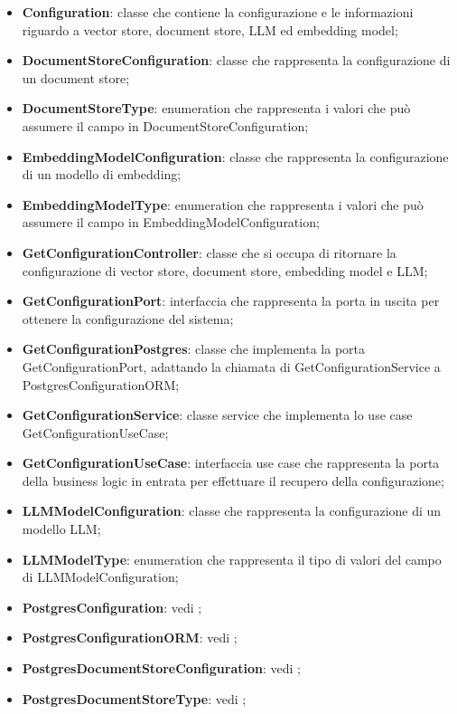 \documentclass[10pt, a4paper]{article}
\begin{document}
\begin{itemize}

    \item \label{Configuration}\textbf{Configuration}: classe che contiene la configurazione e le informazioni riguardo a vector store, document store, LLM ed embedding model;
  
    
    \item \label{DocumentStoreConfiguration}\textbf{DocumentStoreConfiguration}: classe che rappresenta la configurazione di un document store;
    \item \label{DocumentStoreType}\textbf{DocumentStoreType}:  enumeration che rappresenta i valori che può assumere il campo  in DocumentStoreConfiguration;
    \item \label{EmbeddingModelConfiguration}\textbf{EmbeddingModelConfiguration}: classe che rappresenta la configurazione di un modello di embedding;
    \item \label{EmbeddingModelType}\textbf{EmbeddingModelType}: enumeration che rappresenta i valori che può assumere il campo  in EmbeddingModelConfiguration;
    \item \label{GetConfigurationController}\textbf{GetConfigurationController}: classe che si occupa di ritornare la configurazione di vector store, document store, embedding model e LLM;
    \item \label{GetConfigurationPort}\textbf{GetConfigurationPort}: interfaccia che rappresenta la porta in uscita per ottenere la configurazione del sistema;
    \item \label{GetConfigurationPostgres}\textbf{GetConfigurationPostgres}: classe che implementa la porta GetConfigurationPort, adattando la chiamata di GetConfigurationService a PostgresConfigurationORM;
    \item \label{GetConfigurationService}\textbf{GetConfigurationService}: classe service che implementa lo use case GetConfigurationUseCase;
    \item \label{GetConfigurationUseCase}\textbf{GetConfigurationUseCase}: interfaccia use case che rappresenta la porta della business logic in entrata per effettuare il recupero della configurazione; 
    
    \item \label{LLMModelConfiguration}\textbf{LLMModelConfiguration}: classe che rappresenta la configurazione di un modello LLM;
    \item \label{LLMModelType}\textbf{LLMModelType}: enumeration che rappresenta il tipo di valori del campo  di LLMModelConfiguration;
    \item \textbf{PostgresConfiguration}: vedi ;
    \item \textbf{PostgresConfigurationORM}: vedi ;
    \item \textbf{PostgresDocumentStoreConfiguration}: vedi ;
    \item \textbf{PostgresDocumentStoreType}: vedi ;


\end{itemize}
\end{document}
